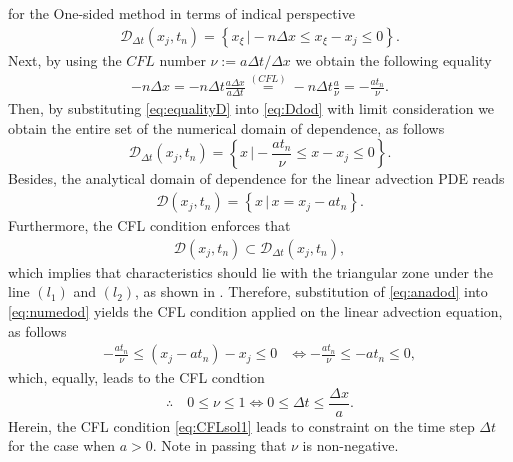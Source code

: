 \documentclass[12pt]{article}
\begin{document}
\begin{enumerate}
	      for the One-sided method in terms of indical perspective
	      \begin{align}\label{eq:Ddod}
		      \mathcal{D}_{\Delta t}\left(x_j,t_n\right)
		      =  \left\{ x_{\xi}\, \Big| -n\Delta x \leq x_{\xi} - x_j \leq 0 \right\}.
	      \end{align}
	      Next, by using the $CFL$ number $\nu := a\Delta t/\Delta x$ we obtain the 
	      following equality
	      \begin{align}\label{eq:equalityD}
		      -n\Delta x 
		      = -n\Delta t\frac{a\Delta x}{a \Delta t}
		      \stackrel{(CFL)}{=}
		      -n\Delta t\frac{a}{\nu}
		      = -\frac{at_n}{\nu}.
	      \end{align}
	      Then, by substituting \eqref{eq:equalityD} into \eqref{eq:Ddod}
	      with limit consideration we obtain the entire set of the numerical
	      domain of dependence, as follows 
	      \begin{equation}\label{eq:numedod}
		      \boxed{
			      \mathcal{D}_{\Delta t}\left(x_j,t_n\right)
			      =  \left\{ x \, \Big| -\frac{at_n}{\nu} \leq x - x_j \leq 0 \right\}
		      }.
	      \end{equation}
	      Besides, the analytical domain of dependence for the linear advection PDE reads
	      \begin{align}\label{eq:anadod}
		      \mathcal{D}\left(x_j,t_n\right)
		      =  \left\{ x \, \Big|\, x = x_{j} - at_n \right\} .
	      \end{align}
	      Furthermore, the CFL condition enforces that
	      \begin{align}\label{eq:CFLconditionenforced}
		      \mathcal{D}\left(x_j,t_n\right) \subset \mathcal{D}_{\Delta t}\left(x_j,t_n\right),
	      \end{align}
	      which implies that characteristics should lie with the triangular zone 
	      under the line $(l_1)$ and $(l_2)$, as shown in .
	      Therefore, substitution of \eqref{eq:anadod} into \eqref{eq:numedod} yields
	      the CFL condition applied on the linear advection equation, as follows
	      \begin{align}
		      -\frac{at_n}{\nu} \leq \left(x_{j} - at_n\right) - x_j \leq 0 
		       & \Leftrightarrow
		      -\frac{at_n}{\nu} \leq - at_n \leq 0,
	      \end{align}
	      which, equally, leads to the CFL condtion
	      \begin{equation}\label{eq:CFLsol1}
		      \therefore\quad
		      \boxed{
			      0 \leq \nu \leq 1
			      \Leftrightarrow 
			      0 \leq \Delta t \leq \frac{\Delta x}{a}.
		      }
	      \end{equation}
	      Herein, the CFL condition \eqref{eq:CFLsol1} leads to 
	      constraint on the time step $\Delta t$ for the case when $a > 0$.
	      Note in passing that $\nu$ is non-negative.
	      

\end{enumerate}
\end{document}
